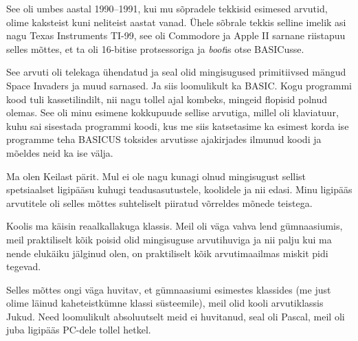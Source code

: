 See oli umbes aastal 1990--1991, kui mu sõpradele tekkisid esimesed arvutid, 
olime kaksteist kuni neliteist aastat vanad. Ühele sõbrale tekkis selline 
imelik asi nagu Texas Instruments TI-99, see oli Commodore ja Apple 
II sarnane riistapuu selles mõttes, et ta oli 16-bitise protsessoriga ja 
\emph{boot}is otse BASICusse. 

See arvuti oli telekaga ühendatud ja seal olid mingisugused primitiivsed mängud 
Space Invaders ja muud sarnased. Ja siis 
loomulikult ka BASIC. Kogu programmi kood tuli kassetilindilt, nii nagu tollel 
ajal kombeks, mingeid flopisid polnud olemas. See oli minu esimene kokkupuude 
sellise arvutiga, millel oli klaviatuur, kuhu sai sisestada programmi koodi, 
kus me siis katsetasime ka esimest korda ise programme teha BASICUS toksides 
arvutisse ajakirjades ilmunud koodi ja mõeldes neid ka ise välja. 


Ma olen Keilast pärit. Mul ei ole nagu kunagi olnud mingisugust 
sellist spetsiaalset ligipääsu kuhugi  teadusasutustele, koolidele ja nii 
edasi. Minu ligipääs arvutitele oli selles mõttes suhteliselt  piiratud 
võrreldes mõnede teistega.


Koolis ma käisin reaalkallakuga klassis. Meil oli väga vahva lend 
gümnaasiumis, meil praktiliselt kõik poisid olid 
mingisuguse arvutihuviga ja nii palju kui ma nende elukäiku jälginud olen, on 
praktiliselt kõik  arvutimaailmas miskit pidi tegevad.


Selles mõttes ongi väga huvitav, et gümnaasiumi esimestes klassides (me just 
olime läinud kaheteistkümne klassi süsteemile), meil olid kooli arvutiklassis  
Jukud. Need loomulikult absoluutselt meid ei huvitanud, 
seal oli Pascal, meil oli juba ligipääs PC-dele tollel 
hetkel. 


